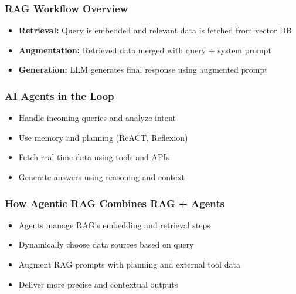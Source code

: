 \begin{frame}[fragile]\frametitle{RAG Workflow Overview}
    \begin{itemize}
        \item \textbf{Retrieval:} Query is embedded and relevant data is fetched from vector DB
        \item \textbf{Augmentation:} Retrieved data merged with query + system prompt
        \item \textbf{Generation:} LLM generates final response using augmented prompt
    \end{itemize}
\end{frame}

\begin{frame}[fragile]\frametitle{AI Agents in the Loop}
    \begin{itemize}
        \item Handle incoming queries and analyze intent
        \item Use memory and planning (ReACT, Reflexion)
        \item Fetch real-time data using tools and APIs
        \item Generate answers using reasoning and context
    \end{itemize}
\end{frame}

\begin{frame}[fragile]\frametitle{How Agentic RAG Combines RAG + Agents}
    \begin{itemize}
        \item Agents manage RAG's embedding and retrieval steps
        \item Dynamically choose data sources based on query
        \item Augment RAG prompts with planning and external tool data
        \item Deliver more precise and contextual outputs
    \end{itemize}
\end{frame}

